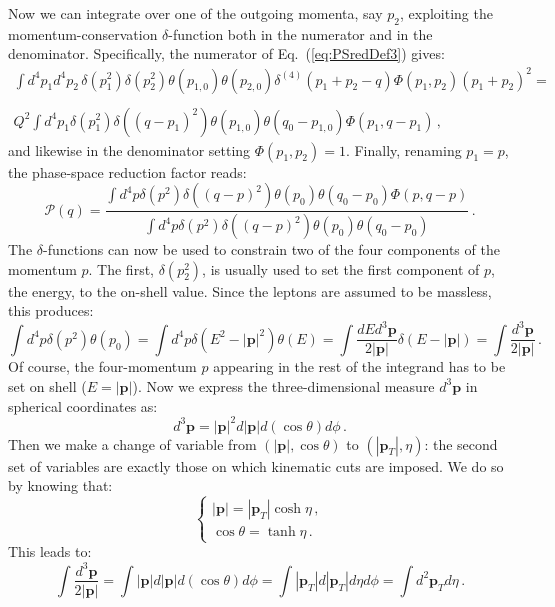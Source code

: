 \documentclass[10pt,a4paper]{article}
\begin{document}
Now we can integrate over one of the outgoing momenta, say $p_2$,
exploiting the momentum-conservation $\delta$-function both in the
numerator and in the denominator. Specifically, the numerator of
Eq.~(\ref{eq:PSredDef3}) gives:
\begin{equation}
\begin{array}{c}
\displaystyle \int d^4p_1 d^4p_2\, \delta(p_1^2)
\delta(p_2^2) \theta(p_{1,0}) \theta(p_{2,0})\delta^{(4)}(p_1+p_2-q)
  \Phi(p_1,p_2) (p_1+p_2)^2 = \\
\\
\displaystyle Q^2 \int d^4p_1 \delta(p_1^2)
\delta((q-p_1)^2) \theta(p_{1,0})
  \theta(q_0-p_{1,0})\Phi(p_1,q-p_1)\,,
\end{array}
\end{equation}
and likewise in the denominator setting $\Phi(p_1,p_2)=1$. Finally,
renaming $p_1=p$, the phase-space reduction factor reads:
\begin{equation}\label{eq:PSredDef4}
  \mathcal{P}(q) = \frac{\displaystyle \int d^4p \delta(p^2) \delta((q-p)^2) \theta(p_{0})
    \theta(q_0-p_{0})  \Phi(p,q-p)}{\displaystyle \int d^4p \delta(p^2) \delta((q-p)^2) \theta(p_{0})
    \theta(q_0-p_{0})  }\,.
\end{equation}
The $\delta$-functions can now be used to constrain two of the four
components of the momentum $p$. The first, $\delta(p_2^2)$, is usually
used to set the first component of $p$, the energy, to the on-shell
value. Since the leptons are assumed to be massless, this
produces:
\begin{equation}
\int d^4p\delta(p^2)\theta(p_0) = \int d^4p\delta(E^2-|\mathbf{p}|^2)\theta(E)=\int\frac{dEd^3\mathbf{p}}{2|\mathbf{p}|}\delta(E-|\mathbf{p}|)=\int\frac{d^3\mathbf{p}}{2|\mathbf{p}|}\,.
\end{equation}
Of course, the four-momentum $p$ appearing in the rest of the
integrand has to be set on shell ($E=|\mathbf{p}|$). Now we express
the three-dimensional measure $d^3\mathbf{p}$ in spherical coordinates
as:
\begin{equation}
d^3\mathbf{p} = |\mathbf{p}|^2d|\mathbf{p}|d(\cos\theta) d\phi\,.
\end{equation}
Then we make a change of variable from $(|\mathbf{p}|,\cos\theta)$ to
$(|\mathbf{p}_T|,\eta)$: the second set of variables are exactly those
on which kinematic cuts are imposed. We do so by knowing that:
\begin{equation}
\left\{
\begin{array}{l}
|\mathbf{p}| = |\mathbf{p}_T|\cosh\eta\,,\\
\cos\theta =\tanh\eta\,.
\end{array}
\right.
\end{equation}
This leads to:
\begin{equation}
\int\frac{d^3\mathbf{p}}{2 |\mathbf{p}|} = \int|\mathbf{p}|d|\mathbf{p}|d(\cos\theta) d\phi=\int|\mathbf{p}_T|d|\mathbf{p}_T|d\eta d\phi=\int d^2\mathbf{p}_T d\eta\,.
\end{equation}
\end{document}
